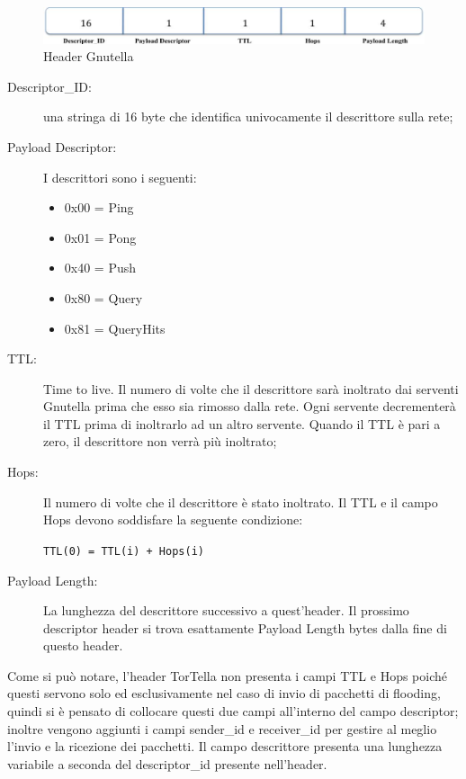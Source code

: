 \begin{figure}[H]
\begin{center}
\includegraphics[scale=0.38]{etc/gnutellaheader.jpg}
\caption{Header Gnutella}
\label{gnutellaheader}
\end{center}
\end{figure}
\begin{description}
\item[Descriptor\_ID:] una stringa di 16 byte che identifica univocamente il descrittore sulla rete;
\item[Payload Descriptor:] I descrittori sono i seguenti:
\begin{itemize}
	\item 0x00 = Ping
	\item 0x01 = Pong
	\item 0x40 = Push
	\item 0x80 = Query
	\item 0x81 = QueryHits	
\end{itemize}
\item[TTL:] Time to live. Il numero di volte che il descrittore sarà inoltrato dai serventi Gnutella prima che esso sia rimosso dalla rete. Ogni servente decrementerà il TTL prima di inoltrarlo ad un altro servente. Quando il TTL è pari a zero, il descrittore non verrà più inoltrato;
\item[Hops:] Il numero di volte che il descrittore è stato inoltrato. Il TTL e il campo Hops devono soddisfare la seguente condizione: 
\begin{center}
\texttt{TTL(0) = TTL(i)  + Hops(i)}
\end{center}
\item[Payload Length:] La lunghezza del descrittore successivo a quest’header. Il prossimo descriptor header si trova esattamente Payload Length bytes dalla fine di questo header.
\end{description}
Come si può notare, l’header TorTella non presenta i campi TTL e Hops poiché questi servono solo ed esclusivamente nel caso di invio di pacchetti di flooding, quindi si è pensato di collocare questi due campi all’interno del campo descriptor; inoltre vengono aggiunti i campi sender\_id e receiver\_id per gestire al meglio l’invio e la ricezione dei pacchetti. Il campo descrittore presenta una lunghezza variabile a seconda del descriptor\_id presente nell’header.
